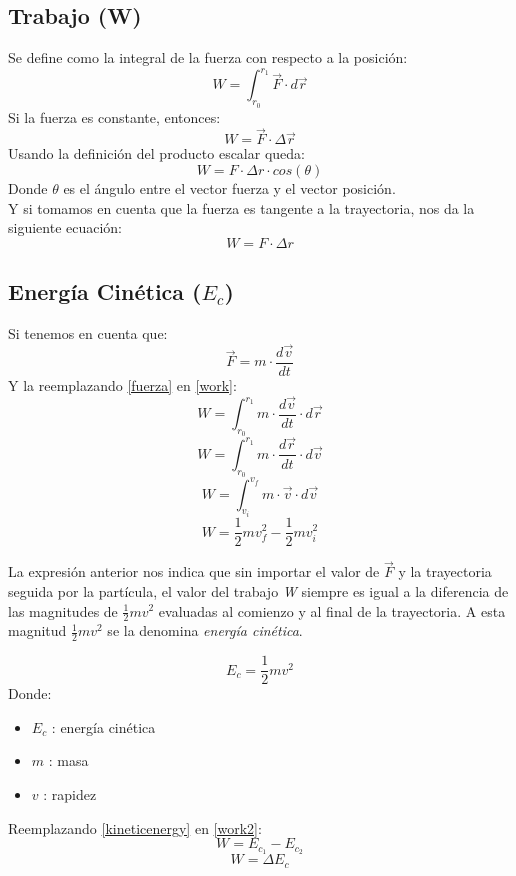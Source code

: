 \documentclass[../main.tex]{subfiles}
\begin{document}
\subsection{Trabajo (W)}
Se define como la integral de la fuerza con respecto a la posición:
\begin{equation} \label{work}
    W = \int_{r_0}^{r_1} \vec{F} \cdot d \vec{r} 
\end{equation}
Si la fuerza es constante, entonces:
\[ W = \vec{F} \cdot \Delta \vec{r} \]
Usando la definición del producto escalar queda:
\[ W = F \cdot \Delta r \cdot cos(\theta)\]
Donde $\theta$ es el ángulo entre el vector fuerza y el vector posición.\\
Y si tomamos en cuenta que la fuerza es tangente a la trayectoria,
nos da la siguiente ecuación:
\begin{equation} \label{work1}
    W = F \cdot \Delta r 
\end{equation}

\subsection{Energía Cinética ($E_c$)}
Si tenemos en cuenta que:
\begin{equation} \label{fuerza}
    \vec{F} = m \cdot \frac{d \vec{v}}{dt}
\end{equation}
Y la reemplazando \ref{fuerza} en \ref{work}:
\[ W = \int_{r_0}^{r_1} m \cdot \frac{d \vec{v}}{dt} \cdot d \vec{r} \]
\[ W = \int_{r_0}^{r_1} m \cdot \frac{d \vec{r}}{dt} \cdot d \vec{v} \]
\[ W = \int_{v_i}^{v_f} m \cdot \vec{v} \cdot d \vec{v} \]
\begin{equation} \label{work2}
    W = \frac{1}{2}mv_f^2 - \frac{1}{2}mv_i^2 
\end{equation}

La expresión anterior nos indica que sin importar el valor de \(\vec{F}\) y la 
trayectoria seguida por la partícula, el valor del trabajo \textit{W}
siempre es igual a la diferencia de las magnitudes de 
\(\frac{1}{2}mv^2\) evaluadas al comienzo y al final de la
 trayectoria. A esta magnitud \(\frac{1}{2}mv^2 \) se la denomina
\textit{energía cinética}.

\begin{equation} \label{kineticenergy}
    E_c = \frac{1}{2}mv^2 
\end{equation}
Donde:
\begin{itemize}
    \item $E_c$ : energía cinética
    \item $m$ : masa
    \item $v$ : rapidez
\end{itemize}

Reemplazando \ref{kineticenergy} en \ref{work2}:
\[W = E_c_1 - E_c_2 \]
\begin{equation} \label{work3}
    W = \Delta E_c
\end{equation}
\end{document}
